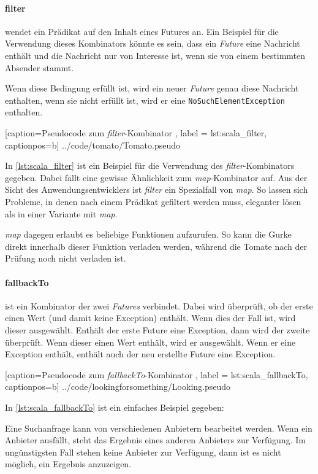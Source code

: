 \paragraph{filter} wendet ein Prädikat auf den Inhalt eines Futures
an. Ein Beispiel für die Verwendung dieses Kombinators könnte es sein,
dass ein \emph{Future} eine Nachricht enthält und die Nachricht nur
von Interesse ist, wenn sie von einem bestimmten Absender stammt.

Wenn diese Bedingung erfüllt ist, wird ein neuer \emph{Future} genau
diese Nachricht enthalten, wenn sie nicht erfüllt ist, wird er eine
\texttt{NoSuchElementException} enthalten.


    [caption={Pseudocode zum \emph{filter}-Kombinator },
       label = lst:scala_filter,
       captionpos=b]
 {../code/tomato/Tomato.pseudo}
 
In \ref{lst:scala_filter} ist ein Beispiel für die Verwendung des
\emph{filter}-Kombinators gegeben. Dabei fällt eine gewisse Ähnlichkeit
zum \emph{map}-Kombinator auf. Aus der Sicht des Anwendungsentwicklers ist
\emph{filter} ein Spezialfall von \emph{map}. So lassen sich Probleme,
in denen nach einem Prädikat gefiltert werden muss, eleganter lösen
als in einer Variante mit \emph{map}.
 
\emph{map} dagegen erlaubt es beliebige Funktionen aufzurufen.
So kann die Gurke direkt innerhalb dieser Funktion verladen werden,
während die Tomate nach der Prüfung noch nicht verladen ist.
 
\paragraph{fallbackTo} ist ein Kombinator der zwei \emph{Futures}
verbindet. Dabei wird überprüft, ob der erste einen Wert (und damit
keine Exception) enthält. Wenn dies der Fall ist, wird dieser ausgewählt.
Enthält der erste Future eine Exception, dann wird der zweite überprüft.
Wenn dieser einen Wert enthält, wird er ausgewählt. Wenn er eine
Exception enthält, enthält auch der neu erstellte Future eine Exception.


    [caption={Pseudocode zum \emph{fallbackTo}-Kombinator },
       label = lst:scala_fallbackTo,
       captionpos=b]
 {../code/lookingforsomething/Looking.pseudo}
 
In \ref{lst:scala_fallbackTo} ist ein einfaches Beispiel gegeben:

Eine Suchanfrage kann von verschiedenen Anbietern bearbeitet werden. 
Wenn ein Anbieter ausfällt, steht das Ergebnis eines anderen Anbieters 
zur Verfügung. Im ungünstigsten Fall stehen keine Anbieter zur Verfügung, 
dann ist es nicht möglich, ein Ergebnis anzuzeigen.

